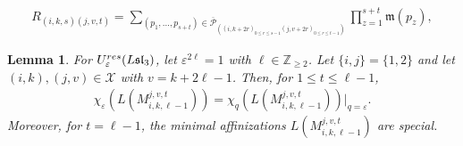 \documentclass[10pt,a4paper]{amsart}
\newtheorem{lemma}{Lemma}
\newcommand{\ZZ}{{\mathbb {Z}}}
\newcommand{\res}{{\rm res}}
\begin{document}
\begin{align}\label{R}
R_{(i,k,s)(j,v,t)}=\sum_{(p_{1},\ldots,p_{s+t}) \in \overline{\mathscr{P}}_{((i,k+2r)_{0 \leq r \leq s-1}(j,v+2r)_{0 \leq r \leq t-1})}} \prod_{z=1}^{s+t}\mathfrak{m}(p_{z}),
\end{align}

\begin{lemma}\label{Lem: minimal affine is special}
For $U_{\varepsilon}^{\res}({L\mathfrak{sl}_{3}})$, let $\varepsilon^{2 \ell}=1$ with $\ell\in \ZZ_{\geq 2}$. Let $\{i,j\}=\{1,2\}$ and let $(i,k), (j,v)\in\mathcal{X}$ with $v=k+2 \ell-1$. Then, for $1\leq t \leq \ell-1$, 
\begin{align*}
\chi_\varepsilon(L(M^{j,v,t}_{i,k,\ell-1}))=\chi_q(L(M^{j,v,t}_{i,k,\ell-1}))|_{q=\varepsilon}.
\end{align*}
Moreover, for $t=\ell-1$, the minimal affinizations $L(M^{j,v,t}_{i,k,\ell-1})$ are special.
\end{lemma}
\end{document}
